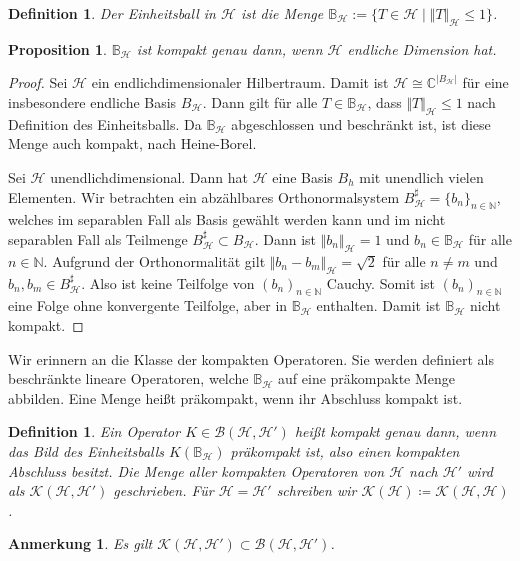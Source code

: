 \documentclass[11pt, hidelinks]{article}
\newcommand{\h}{\mathcal{H}}
\newcommand{\on}{{n \in \mathbb{N}}}
\numberwithin{conj}{section}
\newtheorem{definition}[conj]{Definition}
\newtheorem{remark}[conj]{Anmerkung}
\newtheorem{proposition}[conj]{Proposition}
\begin{document}
\begin{definition}
    Der Einheitsball in $\h$ ist die Menge $\mathbb{B}_\h := \{ T \in \h \; \vert \; \Vert T \Vert_\h \leq 1 \}$.
\end{definition}

\begin{proposition}
    $\mathbb{B}_\h$ ist kompakt genau dann, wenn $\h$ endliche Dimension hat.
\end{proposition}

\begin{proof}
    Sei $\h$ ein endlichdimensionaler Hilbertraum. Damit ist $\h \cong \mathbb{C}^{\vert B_\h \vert}$ für eine insbesondere endliche Basis $B_\h$. Dann gilt für alle $T \in \mathbb{B}_\h$, dass $\Vert T \Vert_\h \leq 1$ nach Definition des Einheitsballs. Da $\mathbb{B}_\h$ abgeschlossen und beschränkt ist, ist diese Menge auch kompakt, nach Heine-Borel.

    Sei $\h$ unendlichdimensional. Dann hat $\h$ eine Basis $B_h$ mit unendlich vielen Elementen. Wir betrachten ein abzählbares Orthonormalsystem $B^\sharp_\h = \{b_n\}_\on$, welches im separablen Fall als Basis gewählt werden kann und im nicht separablen Fall als Teilmenge $B^\sharp_\h \subset B_\h$. Dann ist $\Vert b_n \Vert_\h = 1$ und $b_n \in \mathbb{B}_\h$ für alle $n \in \mathbb{N}$. Aufgrund der Orthonormalität gilt $\Vert b_n - b_m \Vert_\h = \sqrt{2}$ für alle $n \neq m$ und $b_n,b_m \in B^\sharp_\h$. Also ist keine Teilfolge von $(b_n)_\on$ Cauchy. Somit ist $(b_n)_\on$ eine Folge ohne konvergente Teilfolge, aber in $\mathbb{B}_\h$ enthalten. Damit ist $\mathbb{B}_\h$ nicht kompakt.
\end{proof}

Wir erinnern an die Klasse der kompakten Operatoren. Sie werden definiert als beschränkte lineare Operatoren, welche $\mathbb{B}_\h$ auf eine präkompakte Menge abbilden. Eine Menge heißt präkompakt, wenn ihr Abschluss kompakt ist.

\begin{definition}
    Ein Operator $K \in \mathcal{B}(\h,\h')$ heißt kompakt genau dann, wenn das Bild des Einheitsballs $K(\mathbb{B}_\h)$ präkompakt ist, also einen kompakten Abschluss besitzt. Die Menge aller kompakten Operatoren von $\h$ nach $\h'$ wird als $\mathcal{K}(\h,\h')$ geschrieben. Für $\h=\h'$ schreiben wir $\mathcal{K}(\h) \coloneq \mathcal{K}(\h,\h)$. 
\end{definition}

\begin{remark}
    Es gilt $\mathcal{K}(\h,\h') \subset \mathcal{B}(\h,\h')$.
\end{remark}
\end{document}
